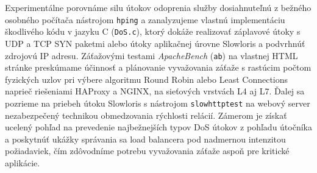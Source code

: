 \documentclass[12pt, a4paper]{article}
\begin{document}
Experimentálne porovnáme silu útokov odoprenia služby dosiahnuteľnú z bežného osobného počítača nástrojom 
\verb|hping| a zanalyzujeme vlastnú implementáciu škodlivého kódu v jazyku C (\verb|DoS.c|), 
ktorý dokáže realizovať  záplavové útoky s UDP a TCP SYN paketmi alebo útoky aplikačnej úrovne Slowloris a 
podvrhnúť zdrojovú IP adresu. Záťažovými testami \emph{ApacheBench} (\verb|ab|) na vlastnej HTML stránke 
preskúmame  účinnosť a plánovanie vyvažovania záťaže s rastúcim počtom  fyzických uzlov pri výbere algoritmu 
Round Robin alebo Least Connections naprieč riešeniami HAProxy a NGINX, na sieťových vrstvách L4 aj L7. Ďalej 
sa pozrieme na priebeh útoku Slowloris s nástrojom \verb|slowhttptest| na webový server nezabezpečený 
technikou obmedzovania rýchlosti relácií. Zámerom je získať ucelený pohľad na prevedenie najbežnejších typov 
DoS útokov z pohľadu útočníka a poskytnúť ukážky správania sa load balancera pod 
nadmernou intenzitou požiadaviek, čím zdôvodníme potrebu vyvažovania záťaže aspoň pre kritické aplikácie. 
\end{document}
